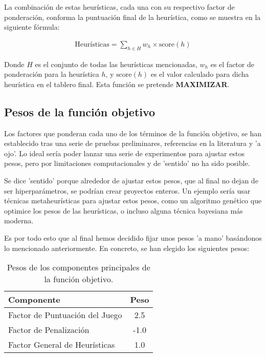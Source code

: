 \documentclass[11pt,spanish,listoffigures,listoftables]{tfgetsinf}
\begin{document}
La combinación de estas heurísticas, cada una con su respectivo factor de ponderación, conforma la puntuación final de la heurística, como se muestra en la siguiente fórmula:

\begin{align*}
\text{Heurísticas} = \sum_{h \in H} w_h \times \text{score}(h)
\end{align*}

Donde $H$ es el conjunto de todas las heurísticas mencionadas, $w_h$ es el factor de ponderación para la heurística $h$, y $\text{score}(h)$ es el valor calculado para dicha heurística en el tablero final. Esta función se pretende \textbf{MAXIMIZAR}.

\subsection{Pesos de la función objetivo}
Los factores que ponderan cada uno de los términos de la función objetivo, se han establecido tras una serie de pruebas preliminares, referencias en la literatura \cite{} y 'a ojo'. Lo ideal sería poder lanzar una serie de experimentos para ajustar estos pesos, pero por limitaciones computacionales y de 'sentido' no ha sido posible.

Se dice 'sentido' porque alrededor de ajustar estos pesos, que al final no dejan de ser hiperparámetros, se podrían crear proyectos enteros. Un ejemplo sería usar técnicas metaheurísticas para ajustar estos pesos, como un algoritmo genético que optimice los pesos de las heurísticas, o incluso alguna técnica bayesiana más moderna.

Es por todo esto que al final hemos decidido fijar unos pesos 'a mano' basándonos lo mencionado anteriormente. En concreto, se han elegido los siguientes pesos:
\begin{table}[H]
    \centering
    \caption{Pesos de los componentes principales de la función objetivo.}
    \label{tab:pesos_principales}
    \begin{tabular}{lc}
        \toprule
        \textbf{Componente} & \textbf{Peso} \\
        \midrule
        Factor de Puntuación del Juego & 2.5 \\
        Factor de Penalización & -1.0 \\
        Factor General de Heurísticas & 1.0 \\
        \bottomrule
    \end{tabular}
\end{table}
\end{document}
